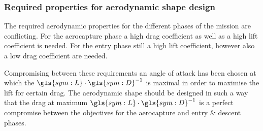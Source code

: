 \subsubsection{Required properties for aerodynamic shape design} \label{sec:trajectory_summary}
The required aerodynamic properties for the different phases of the mission are conflicting. For the aerocapture phase a high drag coefficient as well as a high lift coefficient is needed. For the entry phase still a high lift coefficient, however also a low drag coefficient are needed.

Compromising between these requirements an angle of attack has been chosen at which the $\gls{sym:L}\cdot\gls{sym:D}^{-1}$ is maximal in order to maximise the lift for certain drag. The aerodynamic shape should be designed in such a way that the drag at maximum $\gls{sym:L}\cdot\gls{sym:D}^{-1}$ is a perfect compromise between the objectives for the aerocapture and entry \& descent phases.
